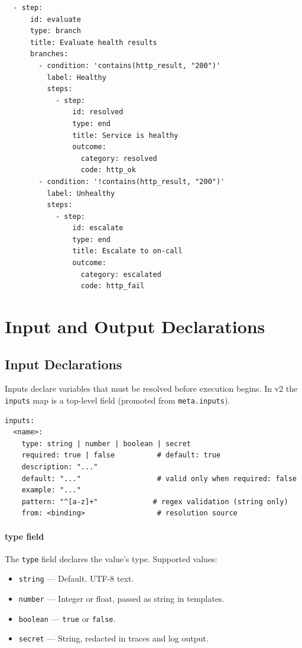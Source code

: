 \begin{verbatim}
  - step:
      id: evaluate
      type: branch
      title: Evaluate health results
      branches:
        - condition: 'contains(http_result, "200")'
          label: Healthy
          steps:
            - step:
                id: resolved
                type: end
                title: Service is healthy
                outcome:
                  category: resolved
                  code: http_ok
        - condition: '!contains(http_result, "200")'
          label: Unhealthy
          steps:
            - step:
                id: escalate
                type: end
                title: Escalate to on-call
                outcome:
                  category: escalated
                  code: http_fail
\end{verbatim}

\section{Input and Output Declarations}
\label{sec:inputs-outputs}

\subsection{Input Declarations}
\label{subsec:inputs}

Inputs declare variables that must be resolved before execution begins.  In v2
the \texttt{inputs} map is a top-level field (promoted from \texttt{meta.inputs}).

\begin{verbatim}
inputs:
  <name>:
    type: string | number | boolean | secret
    required: true | false          # default: true
    description: "..."
    default: "..."                  # valid only when required: false
    example: "..."
    pattern: "^[a-z]+"             # regex validation (string only)
    from: <binding>                 # resolution source
\end{verbatim}

\paragraph{type field}
The \texttt{type} field declares the value's type.  Supported values:

\begin{itemize}
  \item \texttt{string} — Default. UTF-8 text.
  \item \texttt{number} — Integer or float, passed as string in templates.
  \item \texttt{boolean} — \texttt{true} or \texttt{false}.
  \item \texttt{secret} — String, redacted in traces and log output.
\end{itemize}

